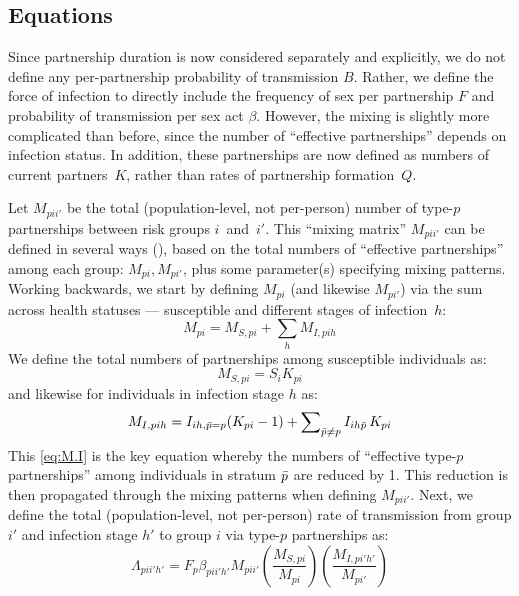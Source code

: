 \subsection{Equations}\label{foi.prop.eq}
Since partnership duration is now considered separately and explicitly,
we do not define any per-partnership probability of transmission $B$.
Rather, we define the force of infection to directly include
the frequency of sex per partnership $F$ and probability of transmission per sex act $\beta$.
However, the mixing is slightly more complicated than before,
since the number of ``effective partnerships'' depends on infection status.
In addition, these partnerships are now defined as numbers of current partners~$K$,
rather than rates of partnership formation~$Q$.
\par
Let $M_{pii'}$ be the total (population-level, not per-person)
number of type-$p$ partnerships between risk groups $i$~and~$i'$.
This ``mixing matrix'' $M_{pii'}$ can be defined in several ways (\eg {}),
based on the total numbers of ``effective partnerships'' among each group: $M_{pi}, M_{pi'}$,
plus some parameter(s) specifying mixing patterns.
Working backwards, we start by defining $M_{pi}$ (and likewise $M_{pi'}$) via
the sum across health statuses --- \ie susceptible and different stages of infection~$h$:
\begin{equation}\label{eq:M.SI}
  M_{pi} = M_{S,pi} + \sum_h M_{I,pih}
\end{equation}
We define the total numbers of partnerships among susceptible individuals as:
\begin{equation}\label{eq:M.S}
  M_{S,pi} = S_{i} K_{pi}
\end{equation}
and likewise for individuals in infection stage $h$ as:
\begin{equation}\label{eq:M.I}
  M_{I,pih} = I_{ih,\bar{p}=p} (K_{pi}-1) + \sum\nolimits_{\bar{p} \ne p} I_{ih\bar{p}}\,K_{pi}
\end{equation}
This \eqref{eq:M.I} is the key equation whereby
the  numbers of ``effective type-$p$ partnerships'' among
individuals in stratum $\bar{p}$ are reduced by 1.
This reduction is then propagated through the mixing patterns when defining $M_{pii'}$.
Next, we define the total (population-level, not per-person) rate of transmission
from group $i'$ and infection stage $h'$ to group $i$ via type-$p$ partnerships as:
\begin{equation}
  \Lambda_{pii'h'} = F_p \beta_{pii'h'} M_{pii'}
  \left(\frac{M_{S,pi}}{M_{pi}}\right)
  \left(\frac{M_{I,pi'h'}}{M_{pi'}}\right)
\end{equation}
